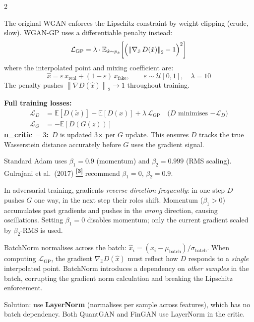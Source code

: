 \documentclass[10pt]{article}
\newcommand{\navybox}[2]{\begin{tcolorbox}[mybox={Navy}{LBg},title={#1}]#2\end{tcolorbox}}
\newcommand{\tealbox}[2]{\begin{tcolorbox}[mybox={Teal}{LBg},title={#1}]#2\end{tcolorbox}}
\newcommand{\amberbox}[2]{\begin{tcolorbox}[mybox={Amber}{ABg},title={#1}]#2\end{tcolorbox}}
\newcommand{\tcite}[1]{%
  \hyperlink{R:#1}{\textsuperscript{\scriptsize\textbf{[#1]}}}}
\newcommand{\E}{\mathbb{E}}
\newcommand{\norm}[1]{\left\|#1\right\|}
\begin{document}
\begin{multicols}{2}
\columnbreak

\tealbox{Gradient Penalty (Gulrajani et al., 2017)}{%
The original WGAN enforces the Lipschitz constraint by weight clipping (crude, slow).
WGAN-GP uses a differentiable penalty instead:
\begin{equation*}
  \mathcal{L}_\text{GP}
  = \lambda \cdot \E_{\hat{x} \sim p_{\hat{x}}}\!\left[
      \Bigl(\norm{\nabla_{\hat{x}}\, D(\hat{x})}_2 - 1\Bigr)^2\right]
\end{equation*}
where the interpolated point and mixing coefficient are:
\begin{equation*}
  \hat{x} = \varepsilon\, x_\text{real} + (1-\varepsilon)\, x_\text{fake},
  \qquad \varepsilon \sim \mathcal{U}[0,1],\quad \lambda = 10
\end{equation*}
The penalty pushes $\norm{\nabla D(\hat{x})}_2 \to 1$ throughout training.

\textbf{Full training losses:}
\begin{align*}
  \mathcal{L}_D &= \E[D(\tilde{x})] - \E[D(x)] + \lambda\,\mathcal{L}_\text{GP}
                   \quad\text{($D$ minimises $-\mathcal{L}_D$)} \\
  \mathcal{L}_G &= -\E[D(G(z))]
\end{align*}
\textbf{n\_critic\,$=3$:}\ $D$ is updated 3$\times$ per $G$ update. This ensures $D$ tracks the true Wasserstein distance accurately before $G$ uses the gradient signal.}

\navybox{Adam Optimiser: Why $\beta_1 = 0$?}{%
Standard Adam uses $\beta_1 = 0.9$ (momentum) and $\beta_2 = 0.999$ (RMS scaling). Gulrajani et al.\ (2017)\tcite{3} recommend $\beta_1 = 0$, $\beta_2 = 0.9$.

In adversarial training, gradients \emph{reverse direction frequently}: in one step $D$ pushes $G$ one way, in the next step their roles shift. Momentum ($\beta_1 > 0$) accumulates past gradients and pushes in the \emph{wrong} direction, causing oscillations. Setting $\beta_1 = 0$ disables momentum; only the current gradient scaled by $\beta_2$-RMS is used.}

\amberbox{Why No BatchNorm in the WGAN-GP Critic?}{%
BatchNorm normalises across the batch: $\hat{x}_i = (x_i - \mu_\text{batch})/\sigma_\text{batch}$.
When computing $\mathcal{L}_\text{GP}$, the gradient $\nabla_{\hat{x}} D(\hat{x})$ must reflect how $D$ responds to a \emph{single} interpolated point. BatchNorm introduces a dependency on \emph{other samples} in the batch, corrupting the gradient norm calculation and breaking the Lipschitz enforcement.

Solution: use \textbf{LayerNorm} (normalises per sample across features), which has no batch dependency. Both QuantGAN and FinGAN use LayerNorm in the critic.}

\end{multicols}
\end{document}

